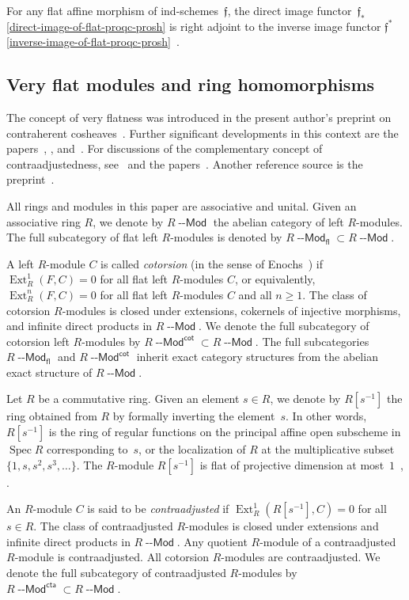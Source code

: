 \documentclass[12pt,a4paper]{amsart}
\newcommand{\+}{\protect\nobreakdash-}
\renewcommand{\:}{\colon}
\DeclareMathOperator{\Ext}{Ext}
\DeclareMathOperator{\Spec}{Spec}
\newcommand{\Modl}{{\operatorname{\mathsf{--Mod}}}}
\newcommand{\fl}{\mathsf{fl}}
\newcommand{\cta}{\mathsf{cta}}
\renewcommand{\cot}{\mathsf{cot}}
\newcommand{\ff}{\mathfrak f}
\theoremstyle{plain}
\theoremstyle{definition}
\begin{document}
 For any flat affine morphism of ind-schemes~$\ff$, the direct image
functor~$\ff_*$ \,\eqref{direct-image-of-flat-proqc-prosh}
is right adjoint to the inverse image functor
$\ff^*$~\,\eqref{inverse-image-of-flat-proqc-prosh}
\,\cite[Sections~3.3 and~3.4]{Psemten}.

\subsection{Very flat modules and ring homomorphisms}
\label{very-flat-modules-and-ring-maps-subsecn}
 The concept of very flatness was introduced in the present author's
preprint on contraherent cosheaves~\cite[Sections~1.1, 1.10,
and~4.1]{Pcosh}.
 Further significant developments in this context are
the papers~\cite{ST}, \cite{PSl1}, and~\cite{ES}.
 For discussions of the complementary concept of contraadjustedness,
see~\cite[Sections~1.1, 2.5, and~4.1]{Pcosh} and
the papers~\cite{ST,Pcta,Pal}.
 Another reference source is the preprint~\cite{Pphil}.

 All rings and modules in this paper are associative and unital.
 Given an associative ring $R$, we denote by $R\Modl$ the abelian
category of left $R$\+modules.
 The full subcategory of flat left $R$\+modules is denoted by
$R\Modl_\fl\subset R\Modl$.

 A left $R$\+module $C$ is called \emph{cotorsion} (in
the sense of Enochs~\cite{En2}) if $\Ext^1_R(F,C)=0$ for all flat
left $R$\+modules $C$, or equivalently, $\Ext^n_R(F,C)=0$ for all
flat left $R$\+modules $C$ and all $n\ge1$.
 The class of cotorsion $R$\+modules is closed under extensions,
cokernels of injective morphisms, and infinite direct products in
$R\Modl$.
 We denote the full subcategory of cotorsion left $R$\+modules by
$R\Modl^\cot\subset R\Modl$.
 The full subcategories $R\Modl_\fl$ and $R\Modl^\cot$ inherit
exact category structures from the abelian exact structure of $R\Modl$.

 Let $R$ be a commutative ring.
 Given an element $s\in R$, we denote by $R[s^{-1}]$ the ring obtained
from $R$ by formally inverting the element~$s$.
 In other words, $R[s^{-1}]$ is the ring of regular functions on
the principal affine open subscheme in $\Spec R$ corresponding to~$s$,
or the localization of $R$ at the multiplicative subset
$\{1,s,s^2,s^3,\dotsc\}$.
 The $R$\+module $R[s^{-1}]$ is flat of projective dimension
at most~$1$ \,\cite[proof of Lemma~2.1]{Pcta}, \cite[Remark~5.1]{Pphil}.

 An $R$\+module $C$ is said to be \emph{contraadjusted} if
$\Ext^1_R(R[s^{-1}],C)=0$ for all $s\in R$.
 The class of contraadjusted $R$\+modules is closed under extensions
and infinite direct products in $R\Modl$.
 Any quotient $R$\+module of a contraadjusted $R$\+module is
contraadjusted.
 All cotorsion $R$\+modules are contraadjusted.
 We denote the full subcategory of contraadjusted $R$\+modules
by $R\Modl^\cta\subset R\Modl$.
\end{document}
